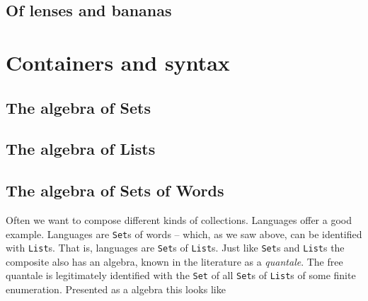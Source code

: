 \subsection{Of lenses and bananas}

\section{Containers and syntax}

\subsection{The algebra of Sets}


\subsection{The algebra of Lists}


\subsection{The algebra of Sets of Words}

Often we want to compose different kinds of collections. Languages
offer a good example. Languages are
\lstinline[language=Scala,mathescape=true]!Set!s of words -- which, as
we saw above, can be identified with
\lstinline[language=Scala,mathescape=true]!List!s. That is, languages
are \lstinline[language=Scala,mathescape=true]!Set!s of
\lstinline[language=Scala,mathescape=true]!List!s. Just like
\lstinline[language=Scala,mathescape=true]!Set!s and
\lstinline[language=Scala,mathescape=true]!List!s the composite also
has an algebra, known in the literature as a \emph{quantale}. The free
quantale is legitimately identified with the
\lstinline[language=Scala,mathescape=true]!Set! of all
\lstinline[language=Scala,mathescape=true]!Set!s of
\lstinline[language=Scala,mathescape=true]!List!s of some finite
enumeration. Presented as a algebra this looks like

